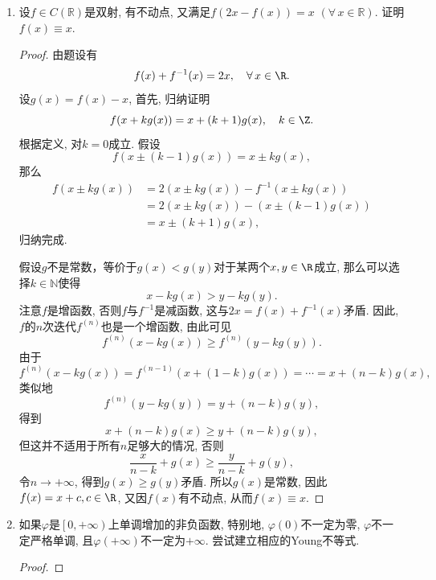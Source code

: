 \begin{quizb}
\begin{enumerate}
\item 设\(f\in C(\mathbb{R})\)是双射, 有不动点, 
又满足\(f(2x-f(x))=x\) \((\forall\, x\in\mathbb{R})\). 证明\(f(x)\equiv x\).
\begin{proof}
由题设有\[f(x)+f^{-1}(x)=2x,\quad \forall\, x\in\R.\]
设\(g(x)=f(x)-x\), 首先, 归纳证明
\[f(x+kg(x))=x+(k+1)g(x),\quad k\in\Z.\]
根据定义, 对\(k=0\)成立. 假设
\[f(x\pm (k-1)g(x))=x\pm kg(x),\]那么\[\begin{split}
f(x\pm kg(x))&=2(x\pm kg(x))-f^{-1}(x\pm kg(x))\\
&=2(x\pm kg(x))-\left(x\pm (k-1)g(x)\right)\\
&=x\pm (k+1)g(x),
\end{split}\]归纳完成.

假设\(g\)不是常数，等价于\(g(x)<g(y)\)对于某两个\(x,y\in\R\)成立, 
那么可以选择\(k\in\mathbb{N}\)使得\[x-kg(x)>y-kg(y).\]
注意\(f\)是增函数, 否则\(f\)与\(f^{-1}\)是减函数, 这与\(2x=f(x)+f^{-1}(x)\)矛盾. 
因此, \(f\)的\(n\)次迭代\(f^{(n)}\)也是一个增函数, 由此可见
\[f^{(n)}(x-kg(x))\geqslant f^{(n)}(y-kg(y)).\]
由于\[f^{(n)}(x-kg(x))=f^{(n-1)}(x+(1-k)g(x))=\cdots=x+(n-k)g(x),\]
类似地\[f^{(n)}(y-kg(y))=y+(n-k)g(y),\]
得到\[x+(n-k)g(x)\geqslant y+(n-k)g(y),\]但这并不适用于所有\(n\)足够大的情况, 否则
\[\frac{x}{n-k}+g(x)\geqslant\frac{y}{n-k}+g(y),\]
令\(n\rightarrow+\infty\), 得到\(g(x)\geqslant g(y)\)矛盾. 所以\(g(x)\)是常数, 
因此\(f(x)=x+c,c\in\R\), 又因\(f(x)\)有不动点, 从而\(f(x)\equiv x\). 
\end{proof}

\item 如果\(\varphi\)是\(\left[0,+\infty\right)\)上单调增加的非负函数, 
特别地, \(\varphi(0)\)不一定为零, \(\varphi\)不一定严格单调, 
且\(\varphi(+\infty)\)不一定为\(+\infty\). 尝试建立相应的Young不等式.
\begin{proof}

\end{proof}


\end{enumerate}
\end{quizb}
